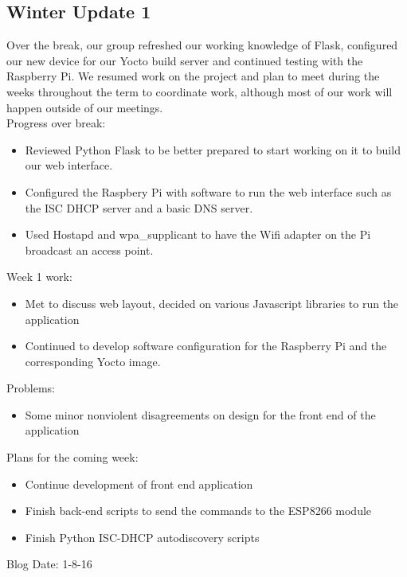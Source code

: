 \subsection{Winter Update 1}
Over the break, our group refreshed our working knowledge of Flask, configured our new device for our Yocto build server and continued testing with the Raspberry Pi. We resumed work on the project and plan to meet during the weeks throughout the term to coordinate work, although most of our work will happen outside of our meetings. \\
Progress over break:
\begin{itemize}
   \item Reviewed Python Flask to be better prepared to start working on it to build our web interface.
   \item Configured the Raspbery Pi with software to run the web interface such as the ISC DHCP server and a basic DNS server.
   \item Used Hostapd and wpa\_supplicant to have the Wifi adapter on the Pi broadcast an access point.
\end{itemize}
Week 1 work:
\begin{itemize}
   \item Met to discuss web layout, decided on various Javascript libraries to run the application
   \item Continued to develop software configuration for the Raspberry Pi and the corresponding Yocto image.
\end{itemize}
Problems:
\begin{itemize}
   \item Some minor nonviolent disagreements on design for the front end of the application
\end{itemize}
Plans for the coming week:
\begin{itemize}
   \item Continue development of front end application
   \item Finish back-end scripts to send the commands to the ESP8266 module
   \item Finish Python ISC-DHCP autodiscovery scripts
\end{itemize}
Blog Date: 1-8-16


